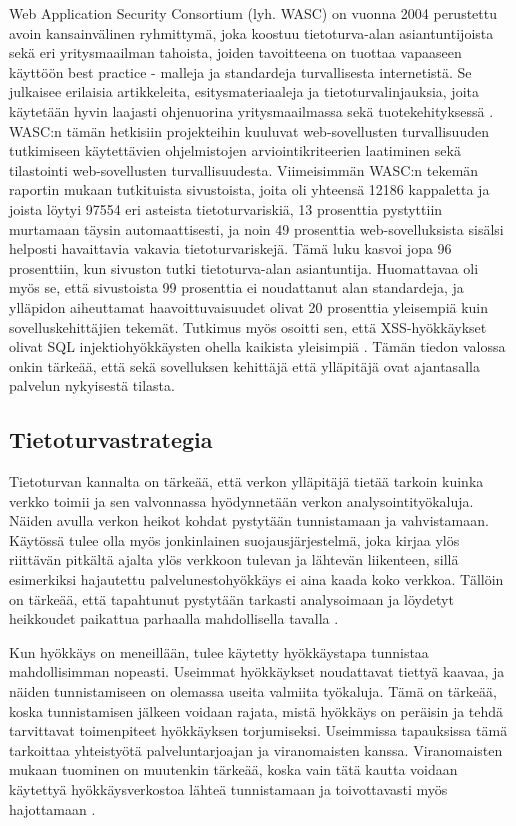 Web Application Security Consortium (lyh. WASC) on vuonna 2004 perustettu avoin kansainvälinen ryhmittymä, joka koostuu tietoturva-alan asiantuntijoista sekä eri 
yritysmaailman tahoista, joiden tavoitteena on tuottaa vapaaseen käyttöön best practice - malleja ja standardeja turvallisesta internetistä. Se julkaisee
erilaisia artikkeleita, esitysmateriaaleja ja tietoturvalinjauksia, joita käytetään hyvin laajasti ohjenuorina yritysmaailmassa sekä tuotekehityksessä \cite{WASC}.
WASC:n tämän hetkisiin projekteihin kuuluvat web-sovellusten turvallisuuden tutkimiseen käytettävien ohjelmistojen arviointikriteerien laatiminen sekä tilastointi
web-sovellusten turvallisuudesta. Viimeisimmän WASC:n tekemän raportin mukaan tutkituista sivustoista, joita oli yhteensä 12186 kappaletta ja joista löytyi 97554 
eri asteista tietoturvariskiä, 13 prosenttia pystyttiin murtamaan täysin automaattisesti, ja noin 49 prosenttia web-sovelluksista sisälsi helposti havaittavia vakavia 
tietoturvariskejä. Tämä luku kasvoi jopa 96 prosenttiin, kun sivuston tutki tietoturva-alan asiantuntija. Huomattavaa oli myös se, että sivustoista 99 prosenttia
ei noudattanut alan standardeja, ja ylläpidon aiheuttamat haavoittuvaisuudet olivat 20 prosenttia yleisempiä kuin sovelluskehittäjien tekemät. Tutkimus myös 
osoitti sen, että XSS-hyökkäykset olivat SQL injektiohyökkäysten ohella kaikista yleisimpiä \cite{WASCb}. Tämän tiedon valossa onkin tärkeää, että sekä sovelluksen
kehittäjä että ylläpitäjä ovat ajantasalla palvelun nykyisestä tilasta. 

\subsection{Tietoturvastrategia}

Tietoturvan kannalta on tärkeää, että verkon ylläpitäjä tietää tarkoin
kuinka verkko toimii ja sen valvonnassa hyödynnetään verkon
analysointityökaluja. Näiden avulla verkon heikot kohdat pystytään
tunnistamaan ja vahvistamaan. Käytössä tulee olla myös jonkinlainen
suojausjärjestelmä, joka kirjaa ylös riittävän pitkältä ajalta ylös
verkkoon tulevan ja lähtevän liikenteen, sillä esimerkiksi hajautettu
palvelunestohyökkäys ei aina kaada koko verkkoa. Tällöin on tärkeää,
että tapahtunut pystytään tarkasti analysoimaan ja löydetyt heikkoudet
paikattua parhaalla mahdollisella tavalla \cite{DDOS}.

Kun hyökkäys on meneillään, tulee käytetty hyökkäystapa tunnistaa mahdollisimman
nopeasti. Useimmat hyökkäykset noudattavat tiettyä kaavaa, ja näiden
tunnistamiseen on olemassa useita valmiita työkaluja. Tämä on tärkeää, koska
tunnistamisen jälkeen voidaan rajata, mistä hyökkäys on peräisin ja tehdä
tarvittavat toimenpiteet hyökkäyksen torjumiseksi. Useimmissa tapauksissa
tämä tarkoittaa yhteistyötä palveluntarjoajan ja viranomaisten kanssa.
Viranomaisten mukaan tuominen on muutenkin tärkeää, koska vain tätä kautta
voidaan käytettyä hyökkäysverkostoa lähteä tunnistamaan ja toivottavasti myös
hajottamaan \cite{DDOS}.

